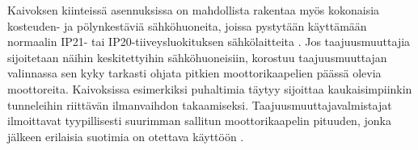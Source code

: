 \documentclass[finnish,12pt,a4paper,pdftex,elec,utf8]{aaltothesis}
\begin{document}
\noindent
Kaivoksen kiinteissä asennuksissa on mahdollista rakentaa myös kokonaisia kosteuden- ja pölynkestäviä sähköhuoneita, joissa pystytään käyttämään normaalin IP21- tai IP20-tiiveysluokituksen sähkölaitteita \cite[s. 253]{Hakapää}. Jos taajuusmuuttajia sijoitetaan näihin keskitettyihin sähköhuoneisiin, korostuu taajuusmuuttajan valinnassa sen kyky tarkasti ohjata pitkien moottorikaapelien päässä olevia moottoreita. Kaivoksissa esimerkiksi puhaltimia täytyy sijoittaa kaukaisimpiinkin tunneleihin riittävän ilmanvaihdon takaamiseksi. Taajuusmuuttajavalmistajat ilmoittavat tyypillisesti suurimman sallitun moottorikaapelin pituuden, jonka jälkeen erilaisia suotimia on otettava käyttöön \cite{880hwman}.








\end{document}
